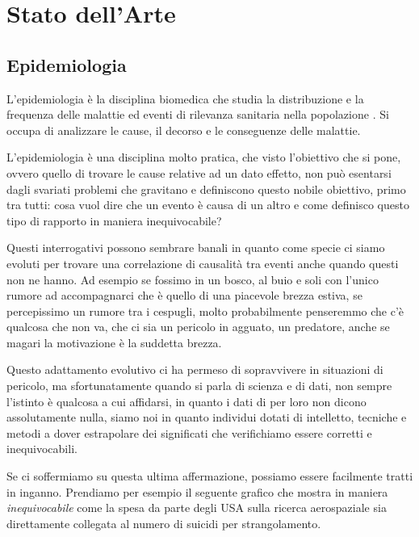 \section{Stato dell'Arte}

\subsection{Epidemiologia}
L'epidemiologia è la disciplina biomedica che studia la 
distribuzione e la frequenza delle malattie ed eventi di 
rilevanza sanitaria nella popolazione \cite{wiki:Epidemiologia}.
Si occupa di analizzare le cause, il decorso e le 
conseguenze delle malattie.\cite{Galea2009-lj} \cite{Parascandola2001-kw}

L'epidemiologia è una disciplina molto pratica, che visto 
l'obiettivo che si pone, ovvero quello di trovare le cause
relative ad un dato effetto, non può esentarsi dagli 
svariati problemi che gravitano e definiscono questo 
nobile obiettivo, primo tra tutti: cosa vuol dire che un
evento è causa di un altro e come definisco questo 
tipo di rapporto in maniera inequivocabile?

Questi interrogativi possono sembrare banali in quanto 
come specie ci siamo evoluti per trovare una correlazione
di causalità tra eventi anche quando questi non ne hanno.
Ad esempio se fossimo in un bosco, al buio e soli con
l'unico rumore ad accompagnarci che è quello di una 
piacevole brezza estiva, se percepissimo un rumore tra 
i cespugli, molto probabilmente penseremmo che c'è 
qualcosa che non va, che ci sia un pericolo in agguato,
un predatore, anche se magari la motivazione è 
la suddetta brezza. 

Questo adattamento evolutivo ci ha permeso di sopravvivere
in situazioni di pericolo, ma sfortunatamente quando 
si parla di scienza e di dati, non sempre l'istinto è 
qualcosa a cui affidarsi, in quanto i dati di
per loro non dicono assolutamente nulla, siamo noi 
in quanto individui dotati di intelletto, tecniche e metodi a dover
estrapolare dei significati che verifichiamo essere corretti e inequivocabili.

Se ci soffermiamo su questa ultima affermazione, possiamo
essere facilmente tratti in inganno. Prendiamo per esempio 
il seguente grafico che mostra in maniera \emph{inequivocabile} 
come la spesa da parte degli USA sulla ricerca aerospaziale sia 
direttamente collegata al numero di suicidi per strangolamento. 

